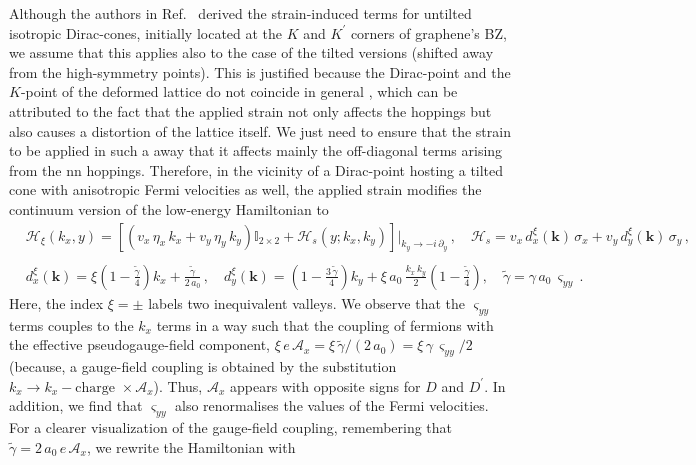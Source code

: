 \documentclass[aps,prb, onecolumn,nofootinbib,citeautoscript,10pt]{revtex4-2}
\newcommand{\bs}[1]{\boldsymbol{#1}}
\def \nn{\nonumber \\}
\begin{document}
Although the authors in Ref.~\cite{strained-dirac-franz} derived the strain-induced terms for untilted isotropic Dirac-cones, initially located at the $K$ and $K^\prime $ corners of graphene's BZ, we assume that this applies also to the case of the tilted versions (shifted away from the high-symmetry points). This is justified because the Dirac-point and the $K$-point of the deformed
lattice do not coincide in general \cite{neto-strain-graphene}, which can be attributed to the fact that the applied strain not only affects the hoppings but also causes a distortion of the lattice itself. We just need to ensure that the strain to be applied in such a away that it affects mainly the off-diagonal terms arising from the nn hoppings. Therefore, in the vicinity of a Dirac-point hosting a tilted cone with anisotropic Fermi velocities as well, the applied strain modifies the continuum version of the low-energy Hamiltonian to \cite{strained-dirac-franz, complex-LL-strained-graphene}
\begin{align}
\label{eqhtot}
& \mathcal H_\xi (k_x, y) = \left[ 
\left(v_x \, \eta_x \, k_x + v_y \,\eta_y\, k_y \right)  {\mathbb I}_{2\times 2} 
+ \mathcal{H}_s(y; k_x, k_y) \right ]\big \vert_{k_y \rightarrow -i\, \partial_y}
\,, \quad 
\mathcal{H}_s  = v_x \, d^\xi_x (\bs k)\,\sigma_x + v_y\,d^\xi_y (\bs k)\,\sigma_y  \,, \nn &
\nn & d^\xi_x(\boldsymbol{k}) = \xi  \left (1 - \frac{ \tilde \gamma} {4}\right ) {k}_x 
+ \frac{ \tilde \gamma} {2\, a_0}  \,,
\quad  d^\xi_y(\boldsymbol{k}) =
\left (1 - \frac{3\, \tilde \gamma } {4} \right )  k_y 
+ \xi\, a_0\,\frac{ k_x \, k_y}{2} \left (1 - \frac{\tilde \gamma} {4}  \right ) ,
\quad \tilde \gamma = \gamma\,a_0 \, \varsigma_{yy}\,.
\end{align}
Here, the index $\xi =\pm$ labels two inequivalent valleys. We observe that the $\varsigma_{yy}$ terms couples to the $k_x$ terms in a way such that the coupling of fermions with the effective pseudogauge-field component, $ \xi\, e \,  \mathcal{A}_x = \xi \, \tilde \gamma /(2\, a_0) = \xi\, \gamma \, \varsigma_{yy} / 2 $ (because, a gauge-field coupling is obtained by the substitution $k_x \rightarrow k_x - \text{charge } \times \mathcal{A}_x $). Thus, $ \mathcal{A}_x $ appears with opposite signs for $ D$ and $D^\prime$. In addition, we find that $\varsigma_{yy}$ also renormalises the values of the Fermi velocities. For a clearer visualization of the gauge-field coupling, remembering that $  
\tilde \gamma  = 2\, a_0 \,e \,  \mathcal{A}_x $, we rewrite the Hamiltonian with
\end{document}
